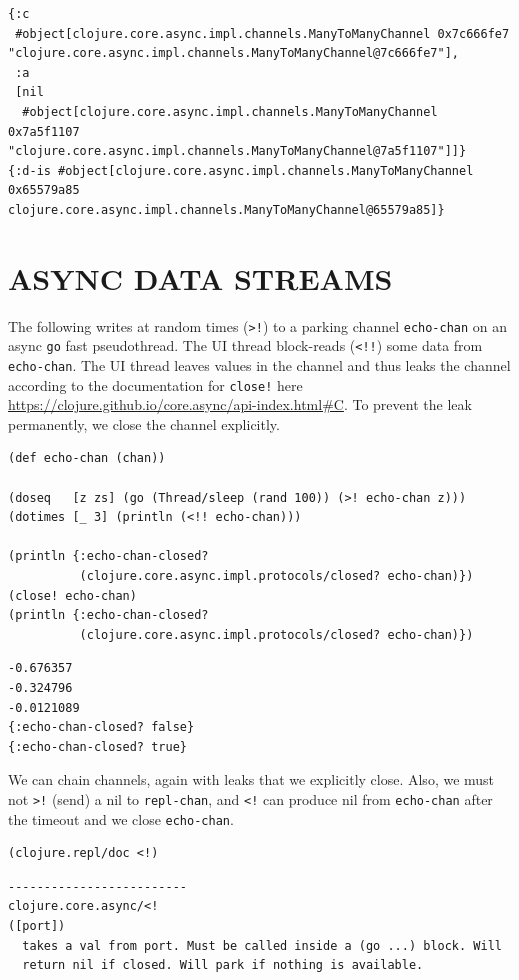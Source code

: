 \documentclass[10pt,oneside,x11names]{article}
\begin{document}
\begin{verbatim}
{:c
 #object[clojure.core.async.impl.channels.ManyToManyChannel 0x7c666fe7 "clojure.core.async.impl.channels.ManyToManyChannel@7c666fe7"],
 :a
 [nil
  #object[clojure.core.async.impl.channels.ManyToManyChannel 0x7a5f1107 "clojure.core.async.impl.channels.ManyToManyChannel@7a5f1107"]]}
{:d-is #object[clojure.core.async.impl.channels.ManyToManyChannel 0x65579a85 clojure.core.async.impl.channels.ManyToManyChannel@65579a85]}
\end{verbatim}

\section{ASYNC DATA STREAMS}
\label{async-data-streams}
The following writes at random times (\texttt{>!}) to a parking channel
\texttt{echo-chan} on an async \texttt{go} fast pseudothread. The UI thread
block-reads (\texttt{<!!}) some data from \texttt{echo-chan}. The UI thread leaves
values in the channel and thus leaks the channel according to the
documentation for \texttt{close!} here
\url{https://clojure.github.io/core.async/api-index.html\#C}. To prevent the
leak permanently, we close the channel explicitly.

\begin{verbatim}
(def echo-chan (chan))

(doseq   [z zs] (go (Thread/sleep (rand 100)) (>! echo-chan z)))
(dotimes [_ 3] (println (<!! echo-chan)))

(println {:echo-chan-closed?
          (clojure.core.async.impl.protocols/closed? echo-chan)})
(close! echo-chan)
(println {:echo-chan-closed?
          (clojure.core.async.impl.protocols/closed? echo-chan)})
\end{verbatim}

\begin{verbatim}
-0.676357
-0.324796
-0.0121089
{:echo-chan-closed? false}
{:echo-chan-closed? true}
\end{verbatim}


We can chain channels, again with leaks that we explicitly close. Also, we must
not \texttt{>!} (send) a nil to \texttt{repl-chan}, and \texttt{<!} can produce nil from \texttt{echo-chan}
after the timeout and we close \texttt{echo-chan}.

\begin{verbatim}
(clojure.repl/doc <!)
\end{verbatim}

\begin{verbatim}
-------------------------
clojure.core.async/<!
([port])
  takes a val from port. Must be called inside a (go ...) block. Will
  return nil if closed. Will park if nothing is available.
\end{verbatim}
\end{document}

